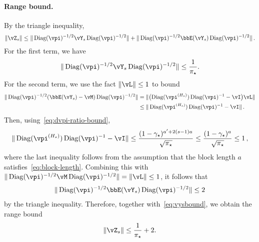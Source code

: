 \paragraph{Range bound.}
By the triangle inequality,
\[
  \norm{\vZ_s}
  \leq \norm{\Diag(\vpi)^{-1/2} \vY_s \Diag(\vpi)^{-1/2}}
  + \norm{\Diag(\vpi)^{-1/2} \bbE(\vY_s) \Diag(\vpi)^{-1/2}}
  \,.
\]
For the first term, we have
\begin{align}
\label{eq:vysbound}
  \norm{\Diag(\vpi)^{-1/2} \vY_s \Diag(\vpi)^{-1/2}} \leq \frac1{\pimin} .
\end{align}
For the second term, we use the fact $\norm{\vL}\le 1$ to bound
\begin{align*}
  \norm{\Diag(\vpi)^{-1/2} (\bbE(\vY_s) -\vM)\Diag(\vpi)^{-1/2}}
  & = \norm{ \bigl(\Diag(\vpi^{(H_s)}) \Diag(\vpi)^{-1} - \vI  \bigr) \vL }
  \\
  & \le \norm{ \Diag(\vpi^{(H_s)}) \Diag(\vpi)^{-1} - \vI }\,.
\end{align*}
Then, using~\cref{eq:dvpi-ratio-bound},
\begin{equation}
  \norm{ \Diag(\vpi^{(H_s)}) \Diag(\vpi)^{-1} - \vI }
  \le \frac{(1-\gap)^{a'+2(s-1)a}}{\sqrt{\pimin}}
  \le \frac{(1-\gap)^{a}}{\sqrt{\pimin}} \le 1\,,
  \label{eq:ysbias}
\end{equation}
where the last inequality follows from the assumption that the
block length $a$ satisfies~\cref{eq:block-length}.
Combining this with
$\norm{\Diag(\vpi)^{-1/2} \vM\Diag(\vpi)^{-1/2}} = \norm{\vL}\le 1$,
it follows that
\begin{align}
\label{eq:evysbound}
\norm{\Diag(\vpi)^{-1/2} \bbE(\vY_s) \Diag(\vpi)^{-1/2}} \le 2
\end{align}
by the triangle inequality.
Therefore, together with~\cref{eq:vysbound}, we obtain the range bound
\[
  \norm{\vZ_s} \leq \frac1{\pimin} + 2
  .
\]


